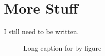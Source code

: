 \chapter{More Stuff}

\label{ch:thisChapterLabel}


I still need to be written.

\begin{figure}
    \caption[Caption for list of figures.]{Long caption for by figure}
    \label{fig:thisFigLabel}
\end{figure}
